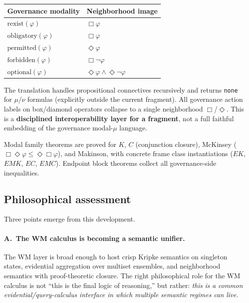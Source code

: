 \documentclass[]{article}
\newcommand{\code}[1]{\texttt{#1}}
\begin{document}
\begin{center}
\begin{tabular}{ll}
\toprule
\textbf{Governance modality} & \textbf{Neighborhood image} \\
\midrule
$\mathrm{rexist}(\varphi)$ & $\Box\varphi$ \\
$\mathrm{obligatory}(\varphi)$ & $\Box\varphi$ \\
$\mathrm{permitted}(\varphi)$ & $\Diamond\varphi$ \\
$\mathrm{forbidden}(\varphi)$ & $\Box\lnot\varphi$ \\
$\mathrm{optional}(\varphi)$ & $\Diamond\varphi \wedge \Diamond\lnot\varphi$ \\
\bottomrule
\end{tabular}
\end{center}

\noindent
The translation handles propositional connectives recursively and returns
\code{none} for $\mu$/$\nu$ formulas (explicitly outside the current
fragment). All governance action labels on box/diamond operators collapse
to a single neighborhood $\Box$/$\Diamond$. This is a \textbf{disciplined
interoperability layer for a fragment}, not a full faithful embedding of
the governance modal-$\mu$ language.

Modal family theorems are proved for $K$, $C$ (conjunction closure),
McKinsey ($\Box\Diamond\varphi \le \Diamond\Box\varphi$), and Makinson,
with concrete frame class instantiations ($EK$, $EMK$, $EC$, $EMC$).
Endpoint block theorems collect all governance-side inequalities.


\subsection{Philosophical assessment}
\label{sec:modal-philosophy}

Three points emerge from this development.

\paragraph{A.\ The WM calculus is becoming a semantic unifier.}
The WM layer is broad enough to host crisp Kripke semantics on singleton
states, evidential aggregation over multiset ensembles, and neighborhood
semantics with proof-theoretic closure. The right philosophical role for
the WM calculus is not ``this is the final logic of reasoning,'' but
rather: \emph{this is a common evidential/query-calculus interface in
which multiple semantic regimes can live.}
\end{document}
